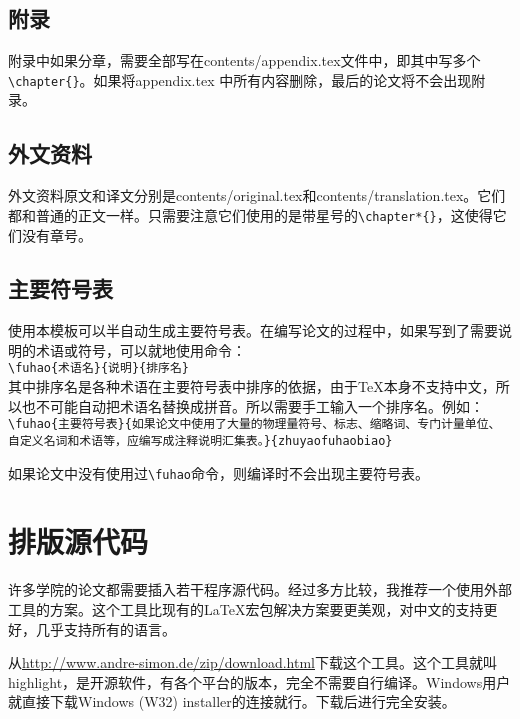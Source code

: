 \subsection{附录}
附录中如果分章，需要全部写在contents/appendix.tex文件中，即其中写多个\verb|\chapter{}|。如果将appendix.tex 中所有内容删除，最后的论文将不会出现附录。
\subsection{外文资料}
外文资料原文和译文分别是contents/original.tex和contents/translation.tex。它们都和普通的正文一样。只需要注意它们使用的是带星号的\verb|\chapter*{}|，这使得它们没有章号。
\subsection{主要符号表}
使用本模板可以半自动生成主要符号表。在编写论文的过程中，如果写到了需要说明的术语或符号，可以就地使用命令：\\
\verb|\fuhao{术语名}{说明}{排序名}|\\
其中排序名是各种术语在主要符号表中排序的依据，由于\TeX{}本身不支持中文，所以也不可能自动把术语名替换成拼音。所以需要手工输入一个排序名。例如：\\
\verb|\fuhao{主要符号表}{如果论文中使用了大量的物理量符号、标志、缩略词、专门计量单位、自定义名词和术语等，应编写成注释说明汇集表。}{zhuyaofuhaobiao}|\\

如果论文中没有使用过\verb|\fuhao|命令，则编译时不会出现主要符号表。
\section{排版源代码}
\label{source:section}
许多学院的论文都需要插入若干程序源代码。经过多方比较，我推荐一个使用外部工具的方案。这个工具比现有的\LaTeX{}宏包解决方案要更美观，对中文的支持更好，几乎支持所有的语言。

从\url{http://www.andre-simon.de/zip/download.html}下载这个工具。这个工具就叫highlight，是开源软件，有各个平台的版本，完全不需要自行编译。Windows用户就直接下载Windows (W32) installer的连接就行。下载后进行完全安装。

